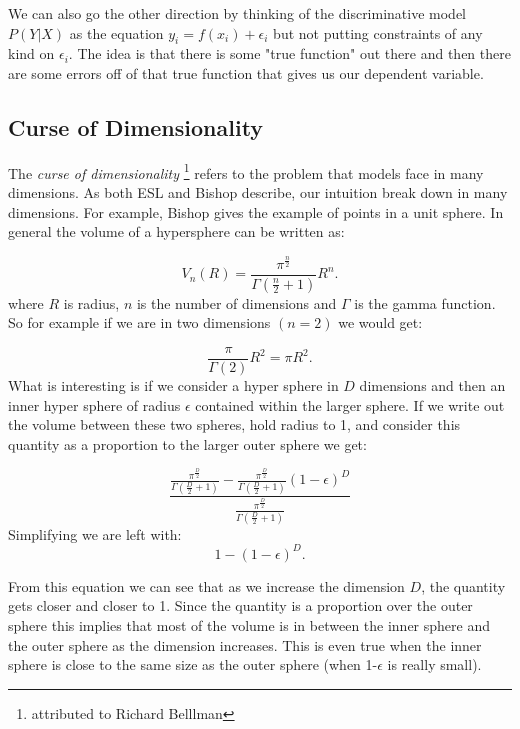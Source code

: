 We can also go the other direction by thinking of the discriminative model $P(Y|X)$ as the equation $y_i = f(x_i) + \epsilon_i$ but not putting constraints of any kind on $\epsilon_i$. The idea is that there is some "true function" out there and then there are some errors off of that true function that gives us our dependent variable.



\subsection{Curse of Dimensionality} \label{sec:curse}

The \emph{curse of dimensionality}  \footnote{attributed to Richard Belllman} refers to the problem that models face in many dimensions. As both ESL and Bishop describe, our intuition break down in many dimensions. For example, Bishop gives the example of points in a unit sphere. In general the volume of a hypersphere can be written as:

\begin{equation}
V_n(R) = \frac{\pi^{\frac{n}{2}}}{\Gamma(\frac{n}{2} + 1)}R^n.
\end{equation}
where $R$ is radius, $n$ is the number of dimensions and $\Gamma$ is the \gls{gamma} function. So for example if we are in two dimensions $(n=2)$ we would get:

\begin{equation}
\frac{\pi}{\Gamma(2)}R^2 = \pi R^2.
\end{equation}
What is interesting is if we consider a hyper sphere in $D$ dimensions and then an inner hyper sphere of radius $\epsilon$ contained within the larger sphere. If we write out the volume between these two spheres, hold radius to 1, and consider this quantity as a proportion to the larger outer sphere we get:

\begin{equation}
\frac{\frac{\pi^{\frac{D}{2}}}{\Gamma(\frac{D}{2} + 1)} - \frac{\pi^{\frac{D}{2}}}{\Gamma(\frac{D}{2} + 1)} (1-\epsilon)^{D}}{\frac{\pi^{\frac{D}{2}}}{\Gamma(\frac{D}{2} + 1)}}
\end{equation}
Simplifying we are left with:
\begin{equation}
1 - (1-\epsilon)^D.
\end{equation}

From this equation we can see that as we increase the dimension $D$, the quantity gets closer and closer to 1. Since the quantity is a proportion over the outer sphere this implies that most of the volume is in between the inner sphere and the outer sphere as the dimension increases. This is even true when the inner sphere is close to the same size as the outer sphere (when 1-$\epsilon$ is really small).

